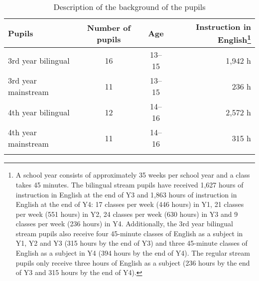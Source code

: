 \documentclass[output=paper]{langsci/langscibook}
\begin{document}
\begin{table}[p]
\caption{Description of the background of the pupils\label{tab:stadt:1}}
\begin{tabular}{l c c r}
\lsptoprule
Pupils &  Number of pupils & Age & Instruction in English\footnote{A school year consists of approximately 35 weeks per school year and a class takes 45 minutes. The bilingual stream pupils have received 1,627 hours of instruction in English at the end of Y3 and 1,863 hours of instruction in English at the end of Y4: 17 classes per week (446 hours) in Y1, 21 classes per week (551 hours) in Y2, 24 classes per week (630 hours) in Y3 and 9 classes per week (236 hours) in Y4. Additionally, the 3rd year bilingual stream pupils also receive four 45-minute classes of English as a subject in Y1, Y2 and Y3 (315 hours by the end of Y3) and three 45-minute classes of English as a subject in Y4 (394 hours by the end of Y4). The regular stream pupils only receive three hours of English as a subject (236 hours by the end of Y3 and 315 hours by the end of Y4).}\\
	\midrule
3rd year bilingual &  16 & 13--15 & 1,942 h\\
3rd year mainstream &  11 & 13--15 & 236 h\\
4th year bilingual &   12 & 14--16 & 2,572 h\\
4th year mainstream &  11 & 14--16 & 315 h\\
\lspbottomrule
\end{tabular}
\end{table}

\begin{table}[p]
\caption{Adv-V and V2 errors in third-year bilingual (B) stream and mainstream (M) group\label{tab:stadt:2}}
\end{table}
\end{document}
